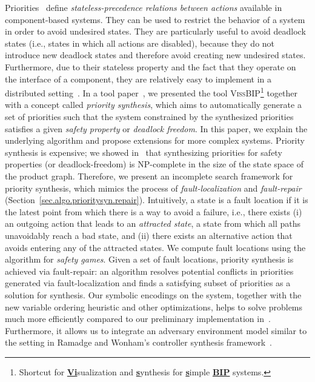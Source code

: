 \documentclass[10pt, a4paper, onecolumn, conference, compsocconf]{IEEEtran}
\begin{document}
Priorities~\cite{goessler2003priority} define \emph{stateless-precedence relations between actions}
available in component-based systems. They can be used to restrict the behavior of a system in order to avoid undesired states.  They are particularly useful to avoid deadlock states (i.e., states in which all actions are disabled), because they do not introduce new deadlock states and therefore avoid creating new undesired states.  Furthermore, due to their stateless property and the fact that they operate on the interface of a component, they are relatively easy to implement in a distributed setting~\cite{GrafPQ10,Bonakdarpour2011distribute}.
In a tool paper~\cite{cheng:vissbip:2011}, we presented the tool \textsc{VissBIP}\footnote{Shortcut for \underline{\textbf{Vi}}sualization and \underline{\textbf{s}}ynthesis for \underline{\textbf{s}}imple \underline{\textbf{BIP}} systems.} together with a concept called \emph{priority synthesis}, which aims to automatically generate a set of priorities such that the system constrained by the synthesized priorities satisfies a given \emph{safety property} or \emph{deadlock freedom}. In this paper, we explain the underlying algorithm and propose extensions for more complex systems. 
Priority synthesis is expensive; we showed in~\cite{cheng:hardness:2011} that synthesizing priorities for safety properties (or deadlock-freedom) is NP-complete in the size of the state space of the product graph.
Therefore, we present an incomplete search framework for priority synthesis, which mimics the process of \emph{fault-localization} and \emph{fault-repair} (Section~\ref{sec.algo.prioritysyn.repair}).
  Intuitively, a state is a fault location if it is the latest point from which there is a way to avoid a failure, i.e., there exists (i) an outgoing action that leads to an \emph{attracted state}, a state from which all paths unavoidably reach a bad state, and (ii) there exists an alternative action that avoids entering any of the attracted states.
We compute fault locations using the algorithm for \emph{safety games}.
Given a set of fault locations, priority synthesis is achieved via fault-repair: an algorithm resolves potential conflicts in priorities generated via fault-localization and finds a satisfying subset of priorities as a solution for synthesis.
Our symbolic encodings on the system, together with the new variable ordering heuristic and other optimizations, helps to solve problems much more efficiently compared to our preliminary implementation in~\cite{cheng:vissbip:2011}.
Furthermore, it allows us to integrate an adversary environment model
similar to the setting in Ramadge and Wonham's controller synthesis framework~\cite{ramadge1989control}.
\end{document}
